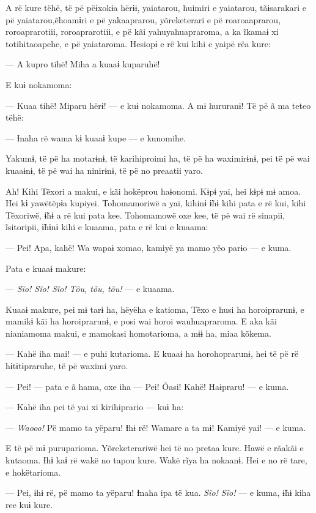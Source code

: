 A rë kure tëhë, të pë pëɨxokɨa hërɨɨ, yaiatarou, huimiri e yaiatarou,
tãɨsarakari e pë yaiatarou,ẽhoamɨri e pë yakaaprarou, yõreketerari e pë
roaroaaprarou, roroaprarotiii, roroaprarotiii, e pë kãi
yahuyahuapraroma, a ka ĩkamaɨ xi totihitaoapehe, e pë yaiataroma.
Hesiopɨ e rë kui kihi e yaipë rëa kure: 

--- A kupro tihë! Miha a kuaaɨ kuparuhë! 

E kuɨ nokamoma: 

--- Kuaa tihë! Miparu hërɨ! --- e kuɨ nokamoma. A mɨ hururanɨ! Të pë ã
ma teteo tëhë:

--- Ɨnaha rë wama kɨ kuaaɨ kupe --- e kunomihe. 

Yakumɨ, të pë ha motarɨnɨ, të karihiproimi ha, të pë ha waximirɨnɨ, pei
të pë wai kuaaɨnɨ, të pë wai ha ninirɨnɨ, të pë no preaatii yaro. 

Ah! Kihi Tẽxori a makui, e kãi hokëprou haɨonomi. Kɨpɨ yai, hei kɨpɨ mɨ
amoa. Hei kɨ yawëtëpɨa kupiyei. Tohomamoriwë a yai, kihinɨ ɨ̃hɨ kihi pata
e rë kui, kihi Tẽxoriwë, ɨ̃hɨ a rë kui pata kee. Tohomamowë oxe kee, të
pë wai rë sinapii, ĩsitoripii, ɨ̃hɨnɨ kihi e kuaama, pata e rë kui e
kuaama: 

--- Pei! Apa, kahë! Wa wapaɨ xomao, kamiyë ya mamo yëo parɨo --- e
kuma. 

Pata e kuaaɨ makure:

--- \textit{Sĩo! Sĩo! Sĩo! Tõu, tõu, tõu!} --- e kuaama. 

Kuaaɨ makure, pei mɨ tarɨ ha, hëyëha e katioma, Tẽxo e husi ha
horoiprarunɨ, e mamikɨ kãi ha horoiprarunɨ, e posi wai horoi
wauhuapraroma. E aka kãi nianiamoma makui, e mamokasi homotarioma, a mɨɨ
ha, miaa kõkema. 

--- Kahë iha mai! --- e puhi kutarioma. E kuaaɨ ha horohoprarunɨ, hei të
pë rë hɨtɨtɨpraruhe, të pë waximi yaro. 

--- Pei! --- pata e ã hama, oxe iha --- Pei! Õasi! Kahë! Haɨpraru! --- e
kuma. 

--- Kahë iha pei të yai xi kirihiprario --- kuɨ ha: 

--- \textit{Waooo!} Pë mamo ta yëparu! Ɨhɨ rë! Wamare a ta mɨ! Kamiyë yai! --- e
kuma. 

E të pë mɨ puruparioma. Yõreketerariwë hei të no pretaa kure. Hawë e
rãakãi e kutaoma. Ɨhɨ kaɨ rë wakë no tapou kure. Wakë rĩya ha nokaanɨ.
Hei e no rë tare, e hokëtarioma. 

--- Pei, ɨhɨ rë, pë mamo ta yëparu! Ɨnaha ipa të kua. \textit{Sĩo! Sĩo!} --- e
kuma, ɨ̃hɨ kiha ree kuɨ kure. 

